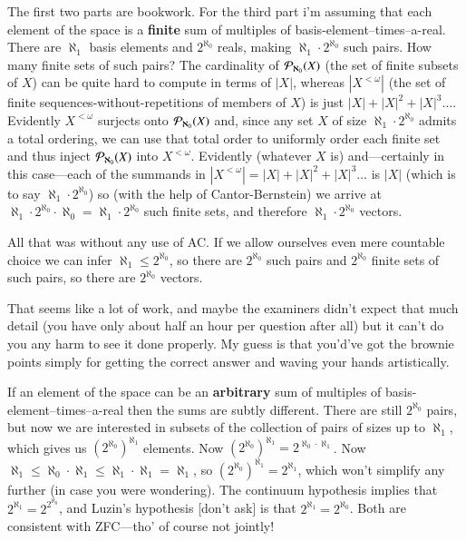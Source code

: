 \documentclass{book}
\begin{document}
The first two parts are bookwork.  For the third part i'm assuming
that each element of the space is a {\bf finite} sum of multiples of
basis-element--times--a-real.  There are $\aleph_1$ basis elements and
$2^{\aleph_0}$ reals, making $\aleph_1 \cdot 2^{\aleph_0}$ such
pairs. How many finite sets of such pairs?  The cardinality of ${\cal
  P}_{\aleph_0}(X)$ (the set of finite subsets of $X$) can be quite
hard to compute in terms of $|X|$, whereas $|X^{<\omega}|$ (the set of
finite sequences-without-repetitions of members of $X$) is just $|X| +
|X|^2 + |X|^3 \ldots$.  Evidently $X^{<\omega}$ surjects onto ${\cal
  P}_{\aleph_0}(X)$ and, since any set $X$ of size $\aleph_1 \cdot
2^{\aleph_0}$ admits a total ordering, we can use that total order to
uniformly order each finite set and thus inject ${\cal
  P}_{\aleph_0}(X)$ into $X^{< \omega}$.  Evidently (whatever $X$ is)
and---certainly in this case---each of the summands in $|X^{<\omega}|
= |X| + |X|^2 + |X|^3 \ldots$ is $|X|$ (which is to say $\aleph_1
\cdot 2^{\aleph_0}$) so (with the help of Cantor-Bernstein) we arrive
at $\aleph_1 \cdot 2^{\aleph_0}\cdot \aleph_0 = \aleph_1 \cdot
2^{\aleph_0}$ such finite sets, and therefore $\aleph_1 \cdot
2^{\aleph_0}$ vectors.  

All that was without any use of AC.  If we allow ourselves even mere
countable choice we can infer $\aleph_1 \leq2^{\aleph_0}$, so there
are $2^{\aleph_0}$ such pairs and $2^{\aleph_0}$ finite sets of such
pairs, so there are $2^{\aleph_0}$ vectors.

\smallskip

That seems like a lot of work, and maybe the examiners didn't expect
that much detail (you have only about half an hour per question after
all) but it can't do you any harm to see it done properly.  My guess
is that you'd've got the brownie points simply for getting the correct
answer and waving your hands artistically.

\smallskip

If an element of the space can be an {\bf arbitrary} sum of multiples
of basis-element--times--a-real then the sums are subtly different.
There are still $2^{\aleph_0}$ pairs, but now we are interested in
subsets of the collection of pairs of sizes up to $\aleph_1$, which
gives us $(2^{\aleph_0})^{\aleph_1}$ elements.  Now
$(2^{\aleph_0})^{\aleph_1} = 2^{\aleph_0 \cdot \aleph_1}$.  Now
$\aleph_1 \leq \aleph_0 \cdot \aleph_1 \leq \aleph_1 \cdot \aleph_1 =
\aleph_1$, so $(2^{\aleph_0})^{\aleph_1} = 2^{\aleph_1}$, which won't
simplify any further (in case you were wondering).  The continuum
hypothesis implies that $2^{\aleph_1} = 2^{2^{\aleph_0}}$, and Luzin's
hypothesis [don't ask] is that $2^{\aleph_1} = 2^{\aleph_0}$.  Both
are consistent with ZFC---tho' of course not jointly!
\end{document}
